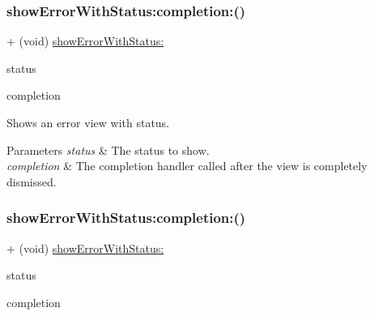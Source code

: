\subsubsection{\texorpdfstring{show\+Error\+With\+Status\+:completion\+:()}{showErrorWithStatus:completion:()}\hspace{0.1cm}{\footnotesize\ttfamily [1/3]}}
{\footnotesize\ttfamily + (void) \mbox{\hyperlink{interface_k_v_n_progress_a3125f228cdd6685e4cf74fa960bfa234}{show\+Error\+With\+Status\+:}} \begin{DoxyParamCaption}\item[{(N\+S\+String $\ast$)}]{status }\item[{completion:(K\+V\+N\+Completion\+Block)}]{completion }\end{DoxyParamCaption}}

Shows an error view with {\ttfamily status}. 
\begin{DoxyParams}{Parameters}
{\em status} & The status to show. \\
\hline
{\em completion} & The completion handler called after the view is completely dismissed. \\
\hline
\end{DoxyParams}
\mbox{\label{interface_k_v_n_progress_a518bc804665bbc2a01905a6b4caf9459}} 
\subsubsection{\texorpdfstring{show\+Error\+With\+Status\+:completion\+:()}{showErrorWithStatus:completion:()}\hspace{0.1cm}{\footnotesize\ttfamily [2/3]}}
{\footnotesize\ttfamily + (void) \mbox{\hyperlink{interface_k_v_n_progress_a3125f228cdd6685e4cf74fa960bfa234}{show\+Error\+With\+Status\+:}} \begin{DoxyParamCaption}\item[{(N\+S\+String $\ast$)}]{status }\item[{completion:(K\+V\+N\+Completion\+Block)}]{completion }\end{DoxyParamCaption}}

